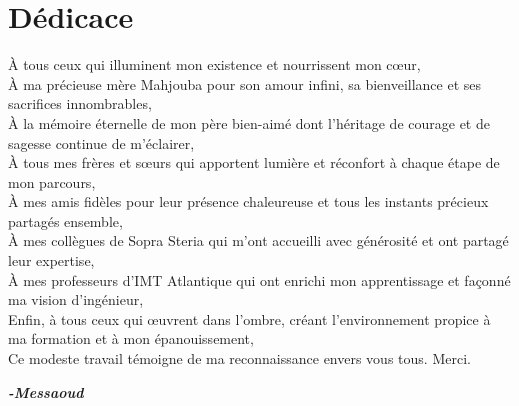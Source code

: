 \chapter*{Dédicace}
\begin{fquote}
\begin{center}
\large{
\uppercase{À} tous ceux qui illuminent mon existence et nourrissent mon cœur, \\[12pt]
\uppercase{À} ma précieuse mère Mahjouba pour son amour infini, sa bienveillance et ses sacrifices innombrables,\\
\uppercase{À} la mémoire éternelle de mon père bien-aimé dont l'héritage de courage et de sagesse continue de m'éclairer, \\
\uppercase{À} tous mes frères et sœurs qui apportent lumière et réconfort à chaque étape de mon parcours, \\
\uppercase{À} mes amis fidèles pour leur présence chaleureuse et tous les instants précieux partagés ensemble,\\
\uppercase{À} mes collègues de Sopra Steria qui m'ont accueilli avec générosité et ont partagé leur expertise,\\
\uppercase{À} mes professeurs d'IMT Atlantique qui ont enrichi mon apprentissage et façonné ma vision d'ingénieur,\\
\uppercase{E}nfin, à tous ceux qui œuvrent dans l'ombre, créant l'environnement propice à ma formation et à mon épanouissement,\\[12pt]
Ce modeste travail témoigne de ma reconnaissance envers vous tous. Merci.
}
\end{center}
\bigskip
\medskip
\end{fquote}
\hspace*{\fill} \textbf{\textit{\large{-Messaoud}}}
\clearpage